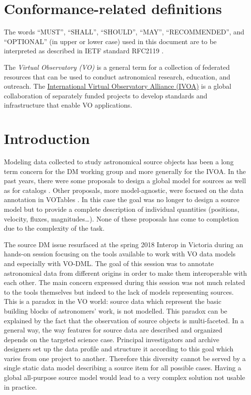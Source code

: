 \documentclass[11pt,a4paper]{ivoa}
\begin{document}
\section*{Conformance-related definitions}

The words ``MUST'', ``SHALL'', ``SHOULD'', ``MAY'', ``RECOMMENDED'', and
``OPTIONAL'' (in upper or lower case) used in this document are to be
interpreted as described in IETF standard RFC2119 \citep{std:RFC2119}.

The \emph{Virtual Observatory (VO)} is a
general term for a collection of federated resources that can be used
to conduct astronomical research, education, and outreach.
The \href{http://www.ivoa.net}{International
Virtual Observatory Alliance (IVOA)} is a global
collaboration of separately funded projects to develop standards and
infrastructure that enable VO applications.


\section{Introduction}

Modeling data collected to study astronomical source objects has been a long term concern for the 
DM working group and more generally for the IVOA.
In the past years, there were some proposals to design a global model for sources \citep{wd:jesusdm}
as well as for catalogs \citep{wd:catalog}.
Other proposals, more model-agnostic, were focused on the data annotation in VOTables
\citep{note:stcvot} \citep{note:seb}.
In this case the goal was no longer to design a source model but to provide a complete description of
individual quantities (positions, velocity, fluxes, magnitudes…).
None of these proposals has come to completion due to the complexity of the task.

The source DM issue resurfaced at the spring 2018 Interop in Victoria during an hands-on session
focusing on the tools available to work with VO data models and especially with VO-DML.
The goal of this session was to annotate astronomical data from different origins in order to make them
interoperable with each other. The main concern expressed during this session was not much related to the tools themselves but indeed to the lack of models representing sources.
This is a paradox in the VO world: source data which represent the basic building
blocks of astronomers' work, is not modelled.
This paradox can be explained by the fact that the observation of source objects is multi-faceted.
In a general way, the way features for source data are described and organized depends on
the targeted science case.
Principal investigators and archive designers set up the data profile and structure it according
to this goal which varies from one project to another.
Therefore this diversity cannot be served by a single static data model describing a source
item for all possible cases.
Having a global all-purpose source model would lead to a very complex solution not usable in practice.
\end{document}

